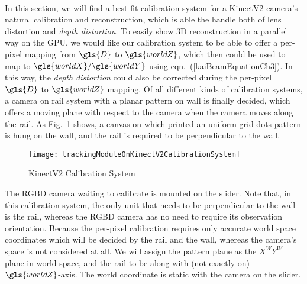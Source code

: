 \\\indent
%
In this section, we will find a best-fit calibration system for a \gls{KinectV2} camera's natural calibration and reconstruction, which is able the handle both of lens distortion and \emph{depth distortion}. %
To easily show \gls{3D} reconstruction in a parallel way on the \gls{GPU}, we would like our calibration system to be able to offer a per-pixel mapping from \(\gls{D}\) to \(\gls{worldZ}\), which then could be used to map to \(\gls{worldX}/\gls{worldY}\) using eqn.~(\ref{kaiBeamEquationCh3}). In this way, the \emph{depth distortion} could also be corrected during the per-pixel \(\gls{D}\) to \(\gls{worldZ}\) mapping. Of all different kinds of calibration systems, a camera on rail system with a planar pattern on wall is finally decided, which offers a moving plane with respect to the camera when the camera moves along the rail. As Fig.~\ref{trackingModuleOnKinectV2CalibrationSystemCh3} shows, a canvas on which printed an uniform grid dots pattern is hung on the wall, and the rail is required to be perpendicular to the wall. 
%
\begin{figure}[t]
\centering
\texttt{[image: trackingModuleOnKinectV2CalibrationSystem]}
\caption{\gls{KinectV2} Calibration System}
\label{trackingModuleOnKinectV2CalibrationSystemCh3}
\end{figure}%
%
The \gls{RGBD} camera waiting to calibrate is mounted on the slider. Note that, in this calibration system, the only unit that needs to be perpendicular to the wall is the rail, whereas the \gls{RGBD} camera has no need to require its observation orientation. Because the per-pixel calibration requires only accurate world space coordinates which will be decided by the rail and the wall, whereas the camera's space is not considered at all. We will assign the pattern plane as the \(X^WY^W\) plane in world space, and the rail to be along with (not exactly on) \(\gls{worldZ}\)-axis. The world coordinate is static with the camera on the slider. %
